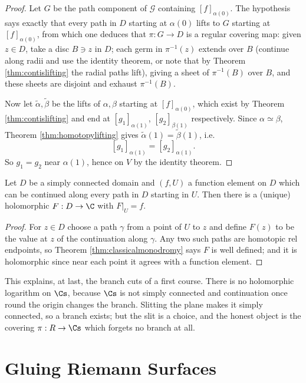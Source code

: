 \begin{proof}
	Let $G$ be the path component of $\mathcal{G}$ containing $[f]_{\alpha(0)}$. The
	hypothesis says exactly that every path in $D$ starting at $\alpha(0)$ lifts to $G$
	starting at $[f]_{\alpha(0)}$, from which one deduces that $\pi : G \to D$ is a regular
	covering map: given $z \in D$, take a disc $B \ni z$ in $D$; each germ in $\pi^{-1}(z)$
	extends over $B$ (continue along radii and use the identity theorem, or note that by
	Theorem \ref{thm:contislifting} the radial paths lift), giving a sheet of $\pi^{-1}(B)$
	over $B$, and these sheets are disjoint and exhaust $\pi^{-1}(B)$.

	Now let $\tilde\alpha, \tilde\beta$ be the lifts of $\alpha,\beta$ starting at
	$[f]_{\alpha(0)}$, which exist by Theorem \ref{thm:contislifting} and end at
	$[g_1]_{\alpha(1)}$, $[g_2]_{\beta(1)}$ respectively. Since $\alpha\simeq\beta$,
	Theorem \ref{thm:homotopylifting} gives $\tilde\alpha(1) = \tilde\beta(1)$, i.e.
	$$
	[g_1]_{\alpha(1)} = [g_2]_{\alpha(1)}.
	$$
	So $g_1 = g_2$ near $\alpha(1)$, hence on $V$ by the identity theorem.
\end{proof}

\begin{corollary}\label{cor:simplyconnectedcont}
	Let $D$ be a simply connected domain and $(f,U)$ a function element on $D$ which can be
	continued along every path in $D$ starting in $U$. Then there is a (unique) holomorphic
	$F : D \to \C$ with $F|_U = f$.
\end{corollary}

\begin{proof}
	For $z \in D$ choose a path $\gamma$ from a point of $U$ to $z$ and define $F(z)$ to be
	the value at $z$ of the continuation along $\gamma$. Any two such paths are homotopic
	rel endpoints, so Theorem \ref{thm:classicalmonodromy} says $F$ is well defined; and it
	is holomorphic since near each point it agrees with a function element.
\end{proof}

This explains, at last, the branch cuts of a first course. There is no holomorphic
logarithm on $\Cs$, because $\Cs$ is not simply connected and continuation once round the
origin changes the branch. Slitting the plane makes it simply connected, so a branch
exists; but the slit is a choice, and the honest object is the covering $\pi : R \to \Cs$
which forgets no branch at all.

\section{Gluing Riemann Surfaces}\label{sec:gluing}

